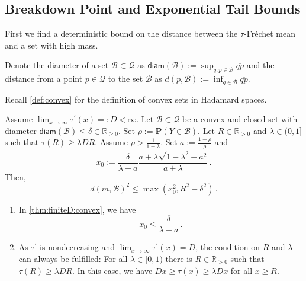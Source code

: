 \documentclass{article}
\newcommand*{\mc}[1]{\mathcal{#1}}
\newcommand{\R}{\mathbb{R}}
\newcommand{\Rp}{\R_{\geq0}}
\newcommand{\Rpp}{\R_{>0}}
\newcommand{\lb}{\left(} %
\newcommand{\rb}{\right)} %
\newcommand{\br}[1]{\lb #1 \rb} %
\newcommand{\brOf}[1]{\!\br{#1}} %
\renewcommand{\Pr}{\mathbf{P}} %
\newcommand{\Prof}[1]{\Pr(#1)}
\newcommand{\pr}{^\prime}
\newcommand{\eqfs}{\,.}
\newcommand{\ol}[2]{\overline{#1#2}}
\newcommand{\tran}{\tau}
\newcommand{\dtran}{\tau\pr}
\newcommand{\diam}{\mathsf{diam}}
\begin{document}
\subsection{Breakdown Point and Exponential Tail Bounds}\label{sec:largedevi}
%
%
%
First we find a deterministic bound on the distance between the $\tran$-Fr\'echet mean and a set with high mass.
%
\begin{notation}
    Denote the diameter of a set $\mc B \subset \mc Q$ as $\diam(\mc B) := \sup_{q,p\in\mc B} \ol qp$ and the distance from a point $p\in\mc Q$ to the set $\mc B$ as $d(p, \mc B) := \inf_{q\in\mc B} \ol qp$.
\end{notation}
%
Recall \cref{def:convex} for the definition of convex sets in Hadamard spaces. 
%
\begin{theorem}\label{thm:finiteD:convex}
    Assume $\lim_{x\to\infty}\dtran(x) =: D < \infty$.
    Let $\mc B \subset \mc Q$ be a convex and closed set with diameter $\diam(\mc B) \leq \delta \in \Rp$. Set $\rho := \Prof{Y \in \mc B}$.
    Let $R \in \Rpp$  and $\lambda \in (0,1]$ such that $\tran(R) \geq \lambda D R$.
    Assume $\rho > \frac{1}{1+\lambda}$.
    Set $a := \frac{1-\rho}{\rho}$ and
    \begin{equation}\label{eq:thm:finiteD:convex:x0}
        x_0
        :=
        \frac{\delta}{\lambda - a} \frac{a + \lambda \sqrt{1 -\lambda^2 + a^2}}{a + \lambda}
        \eqfs
    \end{equation}
    Then, 
    \begin{equation}
        d(m, \mc B)^2 \leq \max\brOf{x_0^2, R^2 - \delta^2}
        \eqfs
    \end{equation}
\end{theorem}
%
\begin{remark}\mbox{}
    \begin{enumerate}[label=(\roman*)]
        \item
        In \cref{thm:finiteD:convex}, we have
        \begin{equation}
            x_0
            \leq 
            \frac{\delta}{\lambda - a}
            \eqfs
        \end{equation}
        \item 
        As $\dtran$ is nondecreasing and $\lim_{x\to\infty}\dtran(x) = D$, the condition on $R$ and $\lambda$ can always be fulfilled: For all $\lambda \in [0,1)$ there is $R\in\Rpp$ such that $\tran(R) \geq \lambda D R$.
        In this case, we have $Dx \geq \tran(x) \geq \lambda D x$ for all $x \geq R$.
    \end{enumerate}
\end{remark}
\end{document}
